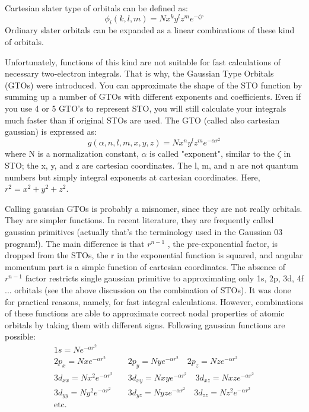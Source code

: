 Cartesian slater type of orbitals can be defined as:
\begin{equation}\label{}
  \phi_{i}(k,l,m) = Nx^{k}y^{l}z^{m}e^{-\zeta r}
\end{equation}
Ordinary slater orbitals can be expanded as a linear combinations of
these kind of orbitals.

Unfortunately, functions of this kind are not suitable for fast
calculations of necessary two-electron integrals. That is why, the
Gaussian Type Orbitals (GTOs) were introduced. You can approximate the
shape of the STO function by summing up a number of GTOs with
different exponents and coefficients. Even if you use 4 or 5 GTO's to
represent STO, you will still calculate your integrals much faster
than if original STOs are used. The GTO (called also cartesian
gaussian) is expressed as:
\begin{equation}\label{}
  g(\alpha, n, l, m, x,y,z) = Nx^{n}y^{l}z^{m}e^{-\alpha r^{2}}
\end{equation}
where N is a normalization constant, $\alpha$ is called "exponent",
similar to the $\zeta$ in STO; the x, y, and z are cartesian
coordinates. The l, m, and n are not quantum numbers but simply
integral exponents at cartesian coordinates. Here, $r^{2} = x^{2} +
y^{2}+ z^{2}$.

Calling gaussian GTOs is probably a misnomer, since they are not
really orbitals. They are simpler functions. In recent literature,
they are frequently called gaussian primitives (actually that's the
terminology used in the Gaussian 03 program!). The main difference is
that $r^{n-1}$ , the pre-exponential factor, is dropped from the STOs,
the r in the exponential function is squared, and angular momentum
part is a simple function of cartesian coordinates. The absence of
$r^{n-1}$ factor restricts single gaussian primitive to approximating
only 1s, 2p, 3d, 4f ... orbitals (see the above discussion on the
combination of STOs). It was done for practical reasons, namely, for
fast integral calculations. However, combinations of these functions
are able to approximate correct nodal properties of atomic orbitals by
taking them with different signs. Following gaussian functions are
possible:
\begin{align}\label{}
  1s = Ne^{-\alpha r^{2}} &  \nonumber \\
  2p_{x} =Nxe^{-\alpha r^{2}} & \quad 2p_{y} =Nye^{-\alpha r^{2}}
  \quad
  2p_{z} =Nze^{-\alpha r^{2}} \nonumber \\
  3d_{xx} = Nx^{2}e^{-\alpha r^{2}} & \quad 3d_{xy} = Nxye^{-\alpha
    r^{2}} \quad  3d_{xz} = Nxze^{-\alpha r^{2}} \nonumber \\
  3d_{yy} = Ny^{2}e^{-\alpha r^{2}} &\quad 3d_{yz} = Nyze^{-\alpha
    r^{2}} \quad 3d_{zz} = Nz^{2}e^{-\alpha r^{2}}  \nonumber \\
  \text{etc.}
\end{align}


